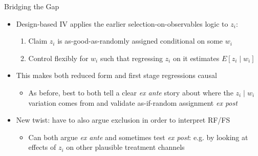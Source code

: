 \documentclass[11pt, english]{beamer}
\begin{document}
	\begin{frame}{Bridging the Gap}
		\begin{itemize}
			\item Design-based IV applies the earlier selection-on-observables logic to
				$z_{i}$:
				\smallskip

				\begin{enumerate}
					\item Claim $z_{i}$ is as-good-as-randomly assigned conditional on some
						$w_{i}$
						\smallskip
						\pause{}

					\item Control flexibly for $w_{i}$ such that regressing $z_{i}$ on it estimates
						$E[z_{i}\mid w_{i}]$
				\end{enumerate}
				\bigskip
				\pause{}

			\item This makes both reduced form and first stage regressions causal
				\smallskip
				\pause{}
				\begin{itemize}
					\item As before, best to both tell a clear \emph{ex ante} story about where
						the $z_{i}\mid w_{i}$ variation comes from and validate as-if-random
						assignment \emph{ex post}
				\end{itemize}
				\bigskip
				\pause{}

			\item New twist: have to also argue exclusion in order to interpret RF/FS
				\smallskip
				\begin{itemize}
					\item Can both argue \emph{ex ante} and sometimes test \emph{ex post}:
						e.g. by looking at effects of $z_{i}$ on other plausible treatment channels
				\end{itemize}
		\end{itemize}
	\end{frame}
\end{document}
